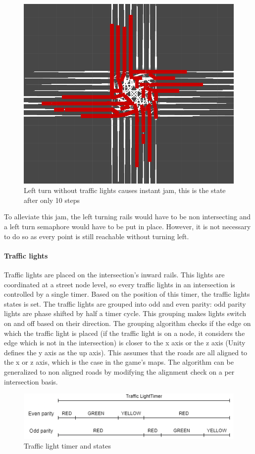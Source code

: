 \documentclass[12pt]{article}
\begin{document}
\begin{figure}[H]
\includegraphics[width=\textwidth]{gridlock}
\caption{Left turn without traffic lights causes instant jam, this is the state after only 10 steps}
\end{figure}
\bigskip 
 To alleviate this jam, the left turning rails would have to be non intersecting and a left turn semaphore would have to be put in place. However, it is not necessary to do so as every point is still reachable without turning left. 

\paragraph{Traffic lights}
Traffic lights are placed on the intersection's inward rails. This lights are coordinated at a street node level, so every traffic lights in an intersection is controlled by a single timer. Based on the position of this timer, the traffic lights states is set. The traffic lights are grouped into odd and even parity: odd parity lights are phase shifted by half a timer cycle. This grouping makes lights switch on and off based on their direction. The grouping algorithm checks if the edge on which the traffic light is placed (if the traffic light is on a node, it considers the edge which is not in the intersection) is closer to the x axis or the z axis (Unity defines the y axis as the up axis). This assumes that the roads are all aligned to the x or z axis, which is the case in the game's maps. The algorithm can be generalized to non aligned roads by modifying the alignment check on a per intersection basis.
\begin{figure}[H]
\includegraphics[width=\textwidth]{semaphore}
\caption{Traffic light timer and states}
\end{figure}
\end{document}

